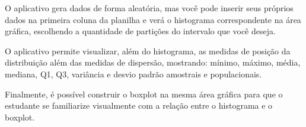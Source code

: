 O aplicativo gera dados de forma aleatória, mas você pode inserir seus próprios dados na primeira coluna da planilha e verá o histograma correspondente na área gráfica, escolhendo a quantidade de partições do intervalo que você deseja.

O aplicativo permite visualizar, além do histograma, as medidas de posição da distribuição além das medidas de dispersão, mostrando: mínimo, máximo, média, mediana, Q1, Q3, variância e desvio padrão amostrais e populacionais.

Finalmente, é possível construir o boxplot na mesma área gráfica para que o estudante se familiarize visualmente com a relação entre o histograma e o boxplot.

\begin{figure}[H]
\centering
\capstart

\noindent{}
\caption{}\label{\detokenize{PE104-E:fig-aplicativo-medidas}}\label{\detokenize{PE104-E:id17}}\end{figure}


